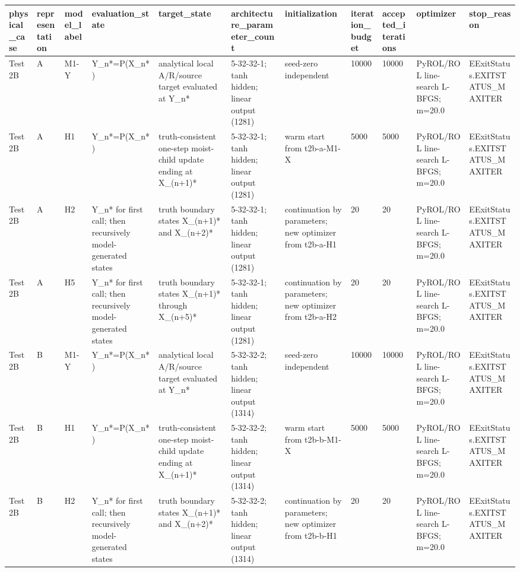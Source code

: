 \begin{tabular}{lllllllllll}
\hline
physical\_case & representation & model\_label & evaluation\_state & target\_state & architecture\_parameter\_count & initialization & iteration\_budget & accepted\_iterations & optimizer & stop\_reason \\
\hline
Test 2B & A & M1-Y & Y\_n*=P(X\_n*) & analytical local A/R/source target evaluated at Y\_n* & 5-32-32-1; tanh hidden; linear output (1281) & seed-zero independent & 10000 & 10000 & PyROL/ROL line-search L-BFGS; m=20.0 & EExitStatus.EXITSTATUS\_MAXITER \\
Test 2B & A & H1 & Y\_n*=P(X\_n*) & truth-consistent one-step moist-child update ending at X\_(n+1)* & 5-32-32-1; tanh hidden; linear output (1281) & warm start from t2b-a-M1-X & 5000 & 5000 & PyROL/ROL line-search L-BFGS; m=20.0 & EExitStatus.EXITSTATUS\_MAXITER \\
Test 2B & A & H2 & Y\_n* for first call; then recursively model-generated states & truth boundary states X\_(n+1)* and X\_(n+2)* & 5-32-32-1; tanh hidden; linear output (1281) & continuation by parameters; new optimizer from t2b-a-H1 & 20 & 20 & PyROL/ROL line-search L-BFGS; m=20.0 & EExitStatus.EXITSTATUS\_MAXITER \\
Test 2B & A & H5 & Y\_n* for first call; then recursively model-generated states & truth boundary states X\_(n+1)* through X\_(n+5)* & 5-32-32-1; tanh hidden; linear output (1281) & continuation by parameters; new optimizer from t2b-a-H2 & 20 & 20 & PyROL/ROL line-search L-BFGS; m=20.0 & EExitStatus.EXITSTATUS\_MAXITER \\
Test 2B & B & M1-Y & Y\_n*=P(X\_n*) & analytical local A/R/source target evaluated at Y\_n* & 5-32-32-2; tanh hidden; linear output (1314) & seed-zero independent & 10000 & 10000 & PyROL/ROL line-search L-BFGS; m=20.0 & EExitStatus.EXITSTATUS\_MAXITER \\
Test 2B & B & H1 & Y\_n*=P(X\_n*) & truth-consistent one-step moist-child update ending at X\_(n+1)* & 5-32-32-2; tanh hidden; linear output (1314) & warm start from t2b-b-M1-X & 5000 & 5000 & PyROL/ROL line-search L-BFGS; m=20.0 & EExitStatus.EXITSTATUS\_MAXITER \\
Test 2B & B & H2 & Y\_n* for first call; then recursively model-generated states & truth boundary states X\_(n+1)* and X\_(n+2)* & 5-32-32-2; tanh hidden; linear output (1314) & continuation by parameters; new optimizer from t2b-b-H1 & 20 & 20 & PyROL/ROL line-search L-BFGS; m=20.0 & EExitStatus.EXITSTATUS\_MAXITER \\

\end{tabular}
